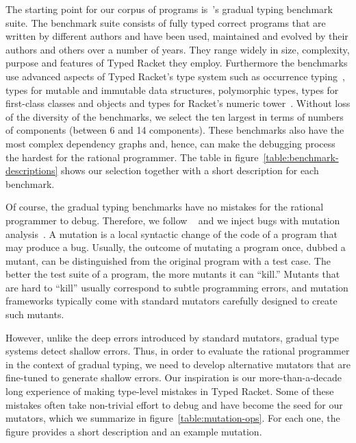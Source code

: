 The starting point for our corpus of programs
is~\citet{gtnffvf-jfp-2019}'s gradual typing benchmark suite. The
benchmark suite consists of fully typed correct programs that are written by different authors
and have been used, maintained and evolved by their authors and others over a
number of years.  They range widely in size, complexity, purpose and
features of Typed Racket they employ.  Furthermore the benchmarks use advanced aspects
of Typed Racket's type system such as occurrence
typing~\cite{tf-icfp-2010}, types for mutable and immutable data
structures, polymorphic types, types for first-class classes and objects and types for
Racket's numeric tower~\cite{stathff-padl-12}. Without loss of the diversity of the benchmarks,
we select the ten largest in terms of numbers of components (between 6 and 14 components).
These benchmarks also have the most complex dependency graphs and, hence,
can make the debugging process the hardest for the rational programmer.
The table in figure~\ref{table:benchmark-descriptions} shows our selection
together with a short description for each benchmark.



Of course, the gradual typing benchmarks have no mistakes for the rational
programmer to debug. Therefore, we follow ~\citet{lksfd-popl-2020} and we
inject bugs with mutation
analysis~\cite{jia2011analysis,demillo1978hints,lipton1971fault}.  A
mutation is a local syntactic change of the code of a program that may
produce a bug. Usually, the outcome of mutating a program once, dubbed a
mutant, can be distinguished from the original program with a test case.
The better the test suite of a program, the more mutants it can ``kill.''
Mutants that are hard to ``kill'' usually correspond to subtle programming
errors, and mutation frameworks typically come with standard mutators
carefully designed to create such mutants.

However,  unlike the deep errors introduced by standard mutators, 
gradual type systems detect shallow errors.  Thus, in order to
evaluate the rational programmer in the context of gradual typing, 
we need to develop alternative mutators
that are fine-tuned to generate shallow errors.  Our inspiration is our
more-than-a-decade long experience of making type-level mistakes in Typed
Racket. Some of these mistakes often take non-trivial effort to debug and
have become the seed for our mutators, which we summarize in
figure~\ref{table:mutation-ops}.  For each one, the figure provides a
short description and an example mutation.


